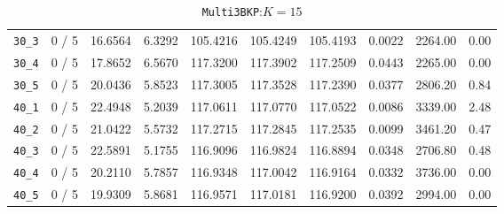 \begin{table}[h!]
\begin{center}
\begin{tabular}{| c | c | c | c | c | c | c | c | c | c |}
\verb|30_3| & 0 / 5 & 16.6564 & 6.3292 & 105.4216 & 105.4249 & 105.4193 & 0.0022 & 2264.00 & 0.00\\ 
\verb|30_4| & 0 / 5 & 17.8652 & 6.5670 & 117.3200 & 117.3902 & 117.2509 & 0.0443 & 2265.00 & 0.00\\ 
\verb|30_5| & 0 / 5 & 20.0436 & 5.8523 & 117.3005 & 117.3528 & 117.2390 & 0.0377 & 2806.20 & 0.84\\ 
\verb|40_1| & 0 / 5 & 22.4948 & 5.2039 & 117.0611 & 117.0770 & 117.0522 & 0.0086 & 3339.00 & 2.48\\ 
\verb|40_2| & 0 / 5 & 21.0422 & 5.5732 & 117.2715 & 117.2845 & 117.2535 & 0.0099 & 3461.20 & 0.47\\ 
\verb|40_3| & 0 / 5 & 22.5891 & 5.1755 & 116.9096 & 116.9824 & 116.8894 & 0.0348 & 2706.80 & 0.48\\ 
\verb|40_4| & 0 / 5 & 20.2110 & 5.7857 & 116.9348 & 117.0042 & 116.9164 & 0.0332 & 3736.00 & 0.00\\ 
\verb|40_5| & 0 / 5 & 19.9309 & 5.8681 & 116.9571 & 117.0181 & 116.9200 & 0.0392 & 2994.00 & 0.00\\ 
\hline
\end{tabular}
\caption{\texttt{Multi3BKP}:$K=15$}
\label{table:multi:15}
\end{center}
\end{table}






